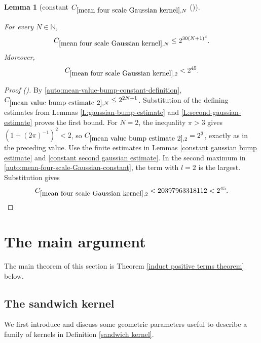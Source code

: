 \documentclass[12pt,reqno]{amsart}
\newcommand{\auto}{{({\tiny\faCar})}}
\theoremstyle{plain}
\newtheorem{lemma}[theorem]{Lemma}
\numberwithin{equation}{section}
\theoremstyle{remark}
\newcommand{\uses}[1]{}
\newcommand{\usesdefs}[1]{}
\newcommand{\leanok}{}
\newcommand{\lean}[1]{}
\newcommand{\N}{{\mathbb N}}
\begin{document}
\begin{lemma}[constant $C_{\ref{mean four scale Gaussian kernel},N}$ \auto]\label{constant mean four scale Gaussian kernel}\uses{mean value bump estimate 2,L:gaussian-bump-estimate,L:second-gaussian-estimate,constant gaussian bump estimate,constant second gaussian estimate,mean four scale Gaussian kernel}\usesdefs{}
\lean{Auto.constantMeanFourScaleGaussianKernel}
\leanok
For every $N\in\N$,
\begin{equation}\label{constant mean four scale Gaussian kernel bound}
C_{\ref{mean four scale Gaussian kernel},N}\le2^{30(N+1)^3}.
\end{equation}
Moreover,
\begin{equation}\label{auto:constant-mean-four-scale-Gaussian-kernel-two}
C_{\ref{mean four scale Gaussian kernel},2}<2^{45}.
\end{equation}
\end{lemma}
\begin{proof}[Proof \auto]
By \eqref{auto:mean-value-bump-constant-definition}, $C_{\ref{mean value bump estimate 2},N}\le2^{2N+1}$. Substitution of the defining estimates from Lemmas \ref{L:gaussian-bump-estimate} and \ref{L:second-gaussian-estimate} proves the first bound. For $N=2$, the inequality $\pi>3$ gives $(1+(2\pi)^{-1})^2<2$, so $C_{\ref{mean value bump estimate 2},2}=2^3$, exactly as in the preceding value. Use the finite estimates in Lemmas \ref{constant gaussian bump estimate} and \ref{constant second gaussian estimate}. In the second maximum in \eqref{auto:mean-four-scale-Gaussian-constant}, the term with $l=2$ is the largest. Substitution gives
\[
C_{\ref{mean four scale Gaussian kernel},2}<20397963318112<2^{45}.
\]
\end{proof}


\section{The main argument}\label{sec:main argument}

The main theorem of this section is Theorem \ref{induct positive terms theorem} below.

\subsection{The sandwich kernel}

We first introduce  and discuss some geometric parameters useful to describe a family of kernels in Definition \ref{sandwich kernel}.
\end{document}
